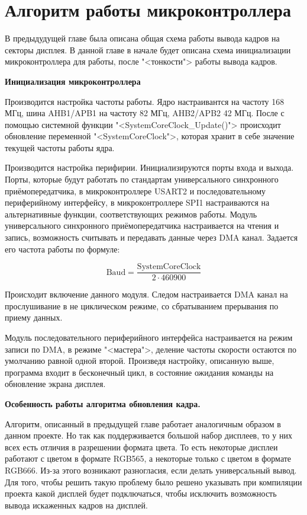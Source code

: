 \chapter{Алгоритм работы микроконтроллера}

	В предыдудущей главе была описана общая схема работы вывода кадров на секторы дисплея. В данной главе в начале будет описана схема инициализации микроконтроллера для работы, после "<тонкости"> работы вывода кадров.
	
	\textbf{Инициализация микроконтроллера}
	
	Производится настройка частоты работы. Ядро настраивантся на частоту 168 МГц, шина AHB1/APB1 на частоту 82 МГц, AHB2/APB2 42 МГц. После с помощью системной функции "<SystemCoreClock\_Update()"> происходит обновление переменной "<SystemCoreClock">, которая хранит в себе значение текущей частоты работы ядра.
	
	Производится настройка перифирии. Инициализируются порты входа и выхода. Порты, которые будут работать по стандартам универсального синхронного приёмопередатчика, в микроконтроллере USART2 и последовательному периферийному интерфейсу, в микроконтроллере SPI1 настраиваются на альтернативные функции, соответствующих режимов работы. Модуль универсального синхронного приёмопередатчика настраивается на чтения и запись, возможность считывать и передавать данные через DMA канал. Задается его частота работы по формуле:
	
	\[\text{Baud} = \frac{\text{SystemCoreClock}}{2 \cdot 460900}\]
	
	Происходит включение данного модуля. Следом настраивается DMA канал на прослушивание в не циклическом режиме, со сбратыванием прерывания по приему данных. 
	
	Модуль последовательного периферийного интерфейса настраивается на режим записи по DMA, в режиме "<мастера">, деление частоты скорости остаются по умолчанию равной одной второй. Произведя настройку, описанную выше, программа входит в бесконечный цикл, в состояние ожидания команды на обновление экрана дисплея.
	
	\textbf{Особенность работы алгоритма обновления кадра.}
	
	Алгоритм, описанный в предыдущей главе работает аналогичным образом в данном проекте. Но так как поддерживается большой набор дисплеев, то у них всех есть отличия в разрешении  формата цвета. То есть некоторые дисплеи работают с цветом в формате RGB565, а некоторые только с цветом в формате RGB666. Из-за этого возникают разногласия, если делать универсальный вывод. Для того, чтобы решить такую проблему было решено указывать при компиляции проекта какой дисплей будет подключаться, чтобы исключить возможность вывода искаженных кадров на дисплей.
	
